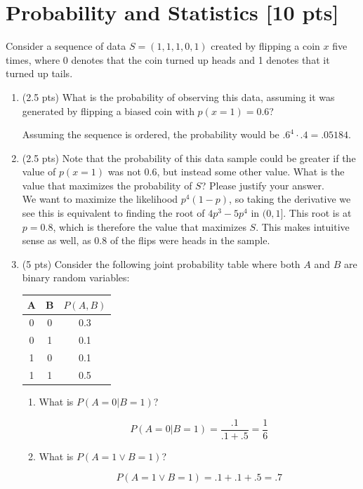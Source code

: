 \documentclass[a4paper]{article}
\theoremstyle{definition}
\newenvironment{soln}{
	\leavevmode\color{blue}\ignorespaces
}{}
\begin{document}
	\section{Probability and Statistics [10 pts]}
	Consider a sequence of data $S = (1, 1, 1, 0, 1)$ created by flipping a coin $x$ five times, where 0 denotes that the coin turned up heads and 1 denotes that it turned up tails.
	\begin{enumerate}
		\item 	(2.5 pts) What is the probability of observing this data, assuming it was generated by flipping a biased coin with $p(x=1) = 0.6$?
		
		\begin{soln}  
		Assuming the sequence is ordered, the probability would be $ .6^4\cdot .4 = .05184 $.
	\end{soln}
		
		\item 	(2.5 pts) Note that the probability of this data sample could be greater if the value of $p(x = 1)$ was not $0.6$, but instead some other value. What is the value that maximizes the probability of $S$? Please justify your answer.\\
		\begin{soln} We want to maximize the likelihood $ p^4(1-p) $, so taking the derivative we see this is equivalent to finding the root of $ 4p^3-5p^4 $ in $ (0,1] $. This root is at $ p=0.8 $, which is therefore the value that maximizes $ S $. This makes intuitive sense as well, as $ 0.8 $ of the flips were heads in the sample. \end{soln}
		
		\item 	(5 pts) Consider the following joint probability table where both $A$ and $B$ are binary random variables: 
		\begin{table}[htb]
			\centering
			\begin{tabular}{ccc}\hline
				A & B & $P(A, B)$  \\\hline
				0 & 0 & 0.3 \\
				0 & 1 & 0.1 \\
				1 & 0 & 0.1 \\
				1 & 1 & 0.5 \\\hline
			\end{tabular}
		\end{table}
		\begin{enumerate}
			\item 	What is $P(A = 0 | B = 1)$?\\
			 \begin{soln}  
			 \[ P(A = 0 | B = 1) = \frac{.1}{.1+.5} = \frac{1}{6} \]
		 	 \end{soln}
			 
			\item 	What is $P(A = 1 \vee B = 1 )$?\\
		     \begin{soln}  
		     	\[ P(A = 1 \vee B = 1 ) = .1+.1+.5 = .7 \]
		     \end{soln}
		\end{enumerate}
	\end{enumerate}
	
\end{document}
